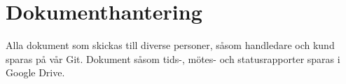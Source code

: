 \section{Dokumenthantering}
Alla dokument som skickas till diverse personer, såsom handledare och kund sparas på vår Git. Dokument såsom tids-, mötes- och statusrapporter sparas i Google Drive.
